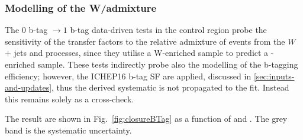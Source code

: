 \subsubsection*{Modelling of the W/\ttbar admixture}
\label{sec:tfSyst_WttAd}
The $0$ b-tag $\rightarrow1$ b-tag data-driven tests in the \mj control region 
probe the sensitivity of the transfer factors to the relative
admixture of events from the $W$ + jets and \ttbar processes, 
since they utilise a W-enriched sample to predict a \ttbar-enriched sample. 
These tests indirectly probe also the modelling of the b-tagging efficiency;
however, the ICHEP16 b-tag SF are applied, discussed in \ref{sec:inputs-and-updates},
thus the derived systematic is not propagated to the fit. Instead this remains
solely as a cross-check.

The result are shown in Fig.~\ref{fig:closureBTag} as a function of \scalht and \njet. 
The grey band is the systematic uncertainty.%

